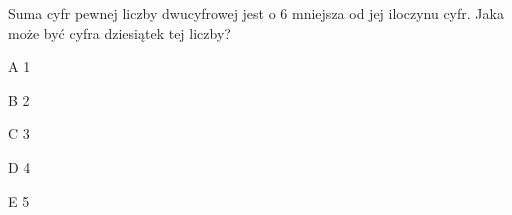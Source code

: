 \begin{tresc}
Suma cyfr pewnej liczby dwucyfrowej jest o 6 mniejsza od jej iloczynu cyfr. Jaka może być cyfra dziesiątek tej liczby?
\end{tresc}
\begin{wariant}{A} 1 \end{wariant}
\begin{wariant}{B} 2 \end{wariant}
\begin{wariant}{C} 3 \end{wariant}
\begin{wariant}{D} 4 \end{wariant}
\begin{wariant}{E} 5 \end{wariant}
